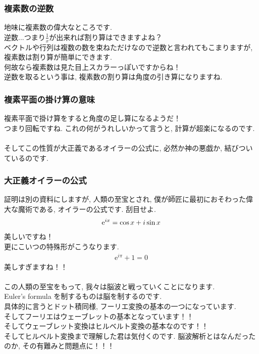 \documentclass[11pt,a4paper]{jsarticle}
\begin{document}
\subsubsection{複素数の逆数}
地味に複素数の偉大なところです.\\
逆数...つまり$\frac{1}{x}$が出来れば割り算はできますよね？\\
ベクトルや行列は複数の数を束ねただけなので逆数と言われてもこまりますが, 複素数は割り算が簡単にできます. \\
何故なら複素数は見た目上スカラーっぽいですからね！\\
逆数を取るという事は, 複素数の割り算は角度の引き算になりますね.\\

\subsubsection{複素平面の掛け算の意味}
複素平面で掛け算をすると角度の足し算になるようだ！\\
つまり回転ですね. これの何がうれしいかって言うと, 計算が超楽になるのです.\\
\\

そしてこの性質が大正義であるオイラーの公式に, 必然か神の悪戯か, 結びついているのです.
\subsubsection{大正義オイラーの公式}
証明は別の資料にしますが, 人類の至宝とされ, 僕が師匠に最初におそわった偉大な魔術である, オイラーの公式です. 刮目せよ.\\
\begin{eqnarray}
\mathrm{e}^{ix} = \cos x + \mathstrut i\sin x
\label{eq:euler}
\end{eqnarray}
美しいですね！\\
更にこいつの特殊形がこうなります.\\
\begin{eqnarray}
\mathrm{e}^{i\pi} + 1 = 0
\end{eqnarray}
美しすぎますね！！\\
\\
この人類の至宝をもって, 我々は脳波と戦っていくことになります.\\
Euler's formula を制するものは脳を制するのです.\\
具体的に言うとドット積同様, フーリエ変換の基本の一つになっています. \\
そしてフーリエはウェーブレットの基本となっています！！\\
そしてウェーブレット変換はヒルベルト変換の基本なのです！！\\
そしてヒルベルト変換まで理解した君は気付くのです. 脳波解析とはなんだったのか, その有難みと問題点に！！！\\
\end{document}
